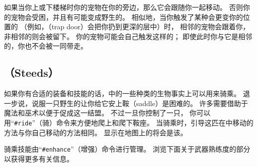 \documentclass[a4paper, 10pt]{article}
\begin{document}
如果当你上或下楼梯时你的宠物在你的旁边，那么它会跟随你一起移动。
否则你的宠物会受困，并且有可能变成野生的。
相似地，当你触发了某种会更变你的位置的\zhTransTraps{}
（例如，\zhTransTrapDoor（trap door）会把你扔到更深的\zhTransDungeon{}层中）时，
相邻的宠物会跟着你，非相邻的则会被留下。
你的宠物可能会自己触发这样的\zhTransTraps；
即使此时你与它是相邻的，你也不会被一同带走。

\subsection*{\zhTransSteeds（Steeds）}

如果你有合适的装备和技能的话，\zhTransDungeon{}中的一些种类的生物事实上可以用来骑乘。
退一步说，说服一只野生的\zhTransBeast{}让你给它安上鞍（saddle）是困难的。
许多\zhTransDungeoneer{}需要借助于魔法和巫术以便于促成这一结盟。
不过一旦你控制了一只\zhTransBeast{}，
你可以用“{\tt \#ride}”（骑）命令来方便地爬上和爬下鞍座。
当骑乘时，引导这匹\zhTransBeast{}在\zhTransDungeon{}中移动的方法与你自己移动的方法相同。
显示在地图上的将会是该\zhTransBeast{}。

骑乘技能由“{\tt \#enhance}”（增强）命令进行管理。
浏览下面关于武器熟练度的部分以获得更多有关信息。
\end{document}
